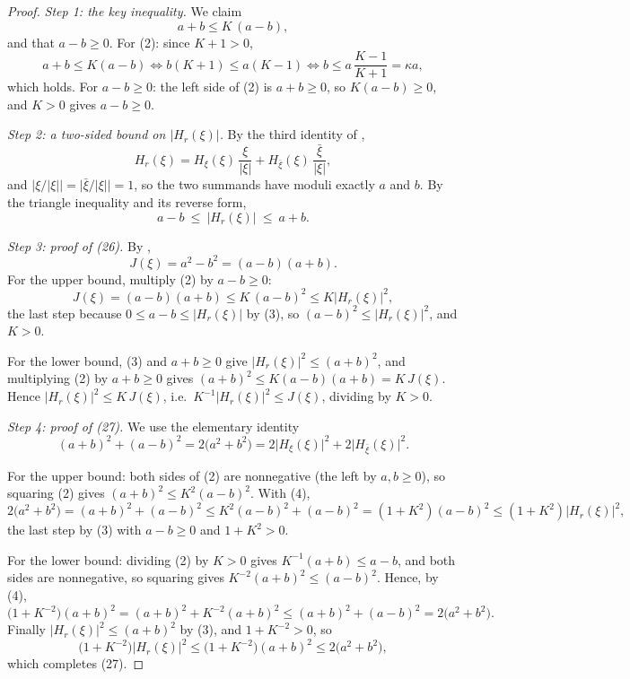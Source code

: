 \begin{proof}
\emph{Step 1: the key inequality.}  We claim
\begin{equation}\tag{2}
  a+b\le K\,(a-b),
\end{equation}
and that $a-b\ge0$.  For (2): since $K+1>0$,
\[
  a+b\le K(a-b)
  \iff b(K+1)\le a(K-1)
  \iff b\le a\,\frac{K-1}{K+1}=\kappa a,
\]
which holds.  For $a-b\ge0$: the left side of (2) is $a+b\ge0$, so
$K(a-b)\ge0$, and $K>0$ gives $a-b\ge0$.

\emph{Step 2: a two-sided bound on $|H_r(\xi)|$.}  By the third identity of
,
\[
  H_r(\xi)=H_\xi(\xi)\,\frac{\xi}{|\xi|}+H_{\bar\xi}(\xi)\,\frac{\bar\xi}{|\xi|},
\]
and $\bigl|\xi/|\xi|\bigr|=\bigl|\bar\xi/|\xi|\bigr|=1$, so the two summands
have moduli exactly $a$ and $b$.  By the triangle inequality and its reverse
form,
\begin{equation}\tag{3}
  a-b\ \le\ \bigl|H_r(\xi)\bigr|\ \le\ a+b .
\end{equation}

\emph{Step 3: proof of (26).}  By ,
\[
  J(\xi)=a^2-b^2=(a-b)(a+b).
\]
For the upper bound, multiply (2) by $a-b\ge0$:
\[
  J(\xi)=(a-b)(a+b)\le K\,(a-b)^2\le K\bigl|H_r(\xi)\bigr|^2,
\]
the last step because $0\le a-b\le|H_r(\xi)|$ by (3), so
$(a-b)^2\le|H_r(\xi)|^2$, and $K>0$.

For the lower bound, (3) and $a+b\ge0$ give
$|H_r(\xi)|^2\le(a+b)^2$, and multiplying (2) by $a+b\ge0$ gives
$(a+b)^2\le K(a-b)(a+b)=K\,J(\xi)$.  Hence
$|H_r(\xi)|^2\le K\,J(\xi)$, i.e.\ $K^{-1}|H_r(\xi)|^2\le J(\xi)$, dividing by
$K>0$.

\emph{Step 4: proof of (27).}  We use the elementary identity
\begin{equation}\tag{4}
  (a+b)^2+(a-b)^2=2\bigl(a^2+b^2\bigr)
  =2\bigl|H_\xi(\xi)\bigr|^2+2\bigl|H_{\bar\xi}(\xi)\bigr|^2 .
\end{equation}

For the upper bound: both sides of (2) are nonnegative (the left by
$a,b\ge0$), so squaring (2) gives $(a+b)^2\le K^2(a-b)^2$.  With (4),
\[
  2\bigl(a^2+b^2\bigr)=(a+b)^2+(a-b)^2\le K^2(a-b)^2+(a-b)^2=(1+K^2)(a-b)^2
  \le(1+K^2)\bigl|H_r(\xi)\bigr|^2,
\]
the last step by (3) with $a-b\ge0$ and $1+K^2>0$.

For the lower bound: dividing (2) by $K>0$ gives $K^{-1}(a+b)\le a-b$, and both
sides are nonnegative, so squaring gives $K^{-2}(a+b)^2\le(a-b)^2$.  Hence, by
(4),
\[
  \bigl(1+K^{-2}\bigr)(a+b)^2=(a+b)^2+K^{-2}(a+b)^2\le(a+b)^2+(a-b)^2
  =2\bigl(a^2+b^2\bigr).
\]
Finally $|H_r(\xi)|^2\le(a+b)^2$ by (3), and $1+K^{-2}>0$, so
\[
  \bigl(1+K^{-2}\bigr)\bigl|H_r(\xi)\bigr|^2\le\bigl(1+K^{-2}\bigr)(a+b)^2
  \le2\bigl(a^2+b^2\bigr),
\]
which completes (27).
\end{proof}
